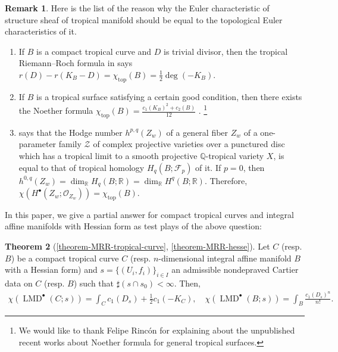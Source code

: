 \documentclass[a4paper,dvipdfmx,reqno,12pt]{amsart}
\theoremstyle{definition}
\newtheorem{theorem}{Theorem}[section]
\newtheorem{remark}[theorem]{Remark}
\newcommand{\opn}[1]{\operatorname{#1}}
\newcommand{\myfootnote}[1]{\hspace{-5pt}\footnote{#1}}
\numberwithin{equation}{section}
\begin{document}
\begin{remark}
Here is the list of the reason why the Euler 
characteristic of structure sheaf of tropical manifold
should be equal to the topological Euler characteristics of it.
\begin{enumerate}
\item If $B$ is a compact tropical curve and $D$ 
is trivial divisor, then the tropical Riemann--Roch 
formula in 
\cite{gathmannRiemannRochTheoremTropical2008a}
says $r(D)-r(K_B-D)=\chi_{\opn{top}}(B)=\frac{1}{2}\opn{deg}(-K_B)$. 
\item If $B$ is a tropical surface satisfying a certain 
good condition, then there exists the Noether formula
$\chi_{\opn{top}}(B)=\frac{c_1(K_B)^{2} +c_2(B)}{12}$ 
\cite[Theorem 5.1]{shawTropicalSurfaces2015a}.
\myfootnote{We would like to thank Felipe Rinc\'on 
for explaining about the unpublished recent works
about Noether formula for general tropical surfaces.
}
\item 
\cite[Corollary 2]{itenbergTropicalHomology2019b} says 
that the Hodge number $h^{p,q}(Z_w)$ of a general fiber $Z_w$ of
a one-parameter family $\mathcal{Z}$ of 
complex projective varieties over a punctured disc which 
has a tropical limit to a smooth projective 
$\mathbb{Q}$-tropical variety $X$, 
is equal to that of tropical homology 
$H_{q}(B;\mathcal{F}_p)$ of it. If $p=0$, then
$h^{0,q}(Z_w)=\dim_{\mathbb{R}}H_{q}(B;\mathbb{R})
=\dim_{\mathbb{R}} H^{q}(B;\mathbb{R})$.
Therefore, $\chi(H^{\bullet}(Z_w;\mathcal{O}_{Z_w}))=
\chi_{\opn{top}}(B)$.
\end{enumerate}

\end{remark}

In this paper, we give a partial answer for compact tropical curves 
and integral affine manifolds with Hessian form
as test plays of the above question:

\begin{theorem}[{\cref{theorem-MRR-tropical-curve},
\cref{theorem-MRR-hesse}}] \label{thm: main}
Let $C$ (resp. $B$) be a compact tropical curve $C$ 
(resp. $n$-dimensional integral 
affine manifold $B$
with a Hessian form) and $s=\{(U_i,f_i)\}_{i\in I}$ an 
admissible nondepraved
Cartier data on $C$ (resp. $B$) such that 
$\sharp(s\cap s_0)<\infty$. Then,
\begin{align}
\chi(\opn{LMD}^{\bullet}(C;s))=\int_C c_1(D_s)+\frac{1}{2}c_1(-K_C), \quad 
\chi(\opn{LMD}^{\bullet}(B;s))=\int_B \frac{c_1(D_s)^{n}}{n!}.
\end{align}
\end{theorem}
\end{document}
